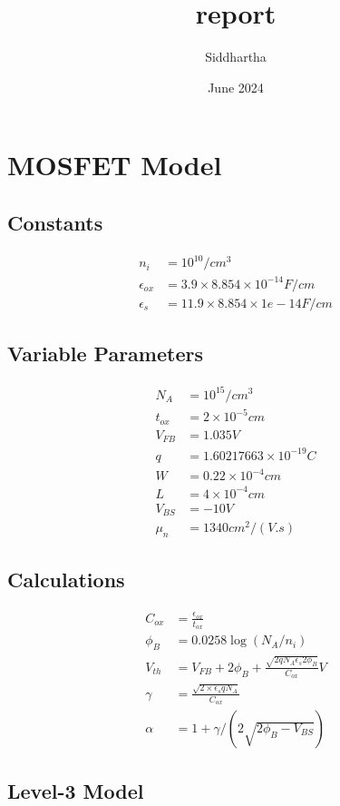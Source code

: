 \documentclass{article}
\title{report}
\author{Siddhartha }
\date{June 2024}
\begin{document}
\maketitle
\tableofcontents
\newpage
\section{MOSFET Model}
\subsection*{Constants}
\begin{align}    
    n_i &= 10^{10}/cm^3 \\
    \epsilon_{ox} &= 3.9\times8.854\times10^{-14} F/cm  \\
    \epsilon_s &= 11.9\times8.854\times1e-14 F/cm  
\end{align}

\subsection*{Variable Parameters}
\begin{align}
    N_A &= 10^{15} /cm^{3} \\
    t_{ox} &= 2\times10^{-5} cm \\
    V_{FB} &= 1.035  V \\
    q &= 1.60217663 \times 10^{-19}  C \\
    W &= 0.22 \times 10^{-4} cm \\
    L &= 4  \times 10^{-4}  cm \\
    V_{BS} &= -10 V \\
    \mu_n  &= 1340 cm^2/(V.s) 
\end{align}
\subsection*{Calculations}
\begin{align}
    C_{ox} &= \frac{\epsilon_{ox}}{t_{ox}} \\
    \phi_B &= 0.0258\log(N_A/n_i)\\
    V_{th} &= V_{FB} + 2 \phi_{B} + \frac{\sqrt{2q N_A \epsilon_s 2 \phi_B}}{C_{ox}}  V  \\
    \gamma &= \frac{\sqrt{2\times\epsilon_s q N_A}}{C_{ox}} \\
    \alpha &= 1 + \gamma/(2\sqrt{2\phi_B-V_{BS}}) 
\end{align}
\subsection*{Level-3 Model}
\end{document}
